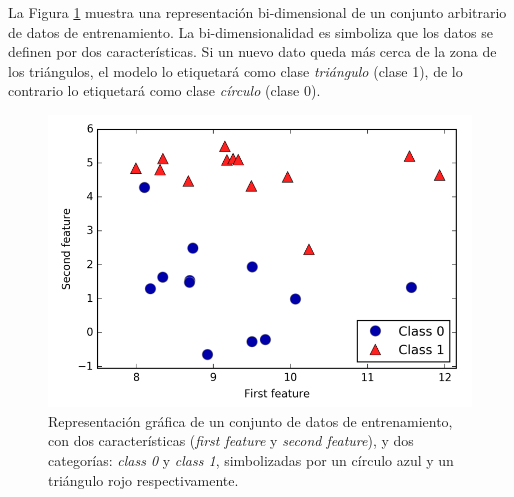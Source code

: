La Figura \ref{fig:scat} muestra una representación bi-dimensional de un conjunto arbitrario de datos de entrenamiento. La bi-dimensionalidad es simboliza que los datos se definen por dos características. Si un nuevo dato queda más cerca de la zona de los triángulos, el modelo lo etiquetará como clase \textit{triángulo} (clase 1), de lo contrario lo etiquetará como clase \textit{círculo} (clase 0). 
%
\begin{figure}[h]
  \centering
  \includegraphics[width=12cm]{figures/image11.png}
  \caption[Representación gráfica de un conjunto de datos de entrenamiento.]{Representación gráfica de un conjunto de datos de entrenamiento, con dos características (\emph{first feature} y \emph{second feature}), y dos categorías: \emph{class 0} y \emph{class 1}, simbolizadas por un círculo azul y un triángulo rojo respectivamente.
  }
  \label{fig:scat}
\end{figure}

